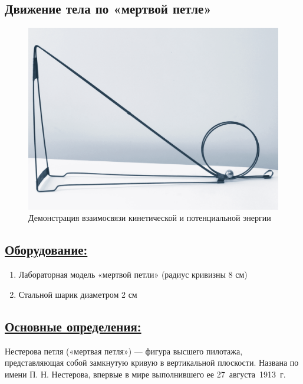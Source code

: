 \documentclass[14pt,a4paper,oneside]{extarticle}	%
\begin{document}

\begin{center}
	\subsection*{Движение тела по «мертвой петле»}
\end{center}

\begin{figure}[H] 
	\centering 		
	\includegraphics[width=0.75\linewidth]{loop-1.png}
	\caption{Демонстрация взаимосвязи кинетической и потенциальной энергии}
	\label{loop-1}
\end{figure}

\subsection*{\underline{Оборудование:}}

\begin{enumerate}
	\item Лабораторная модель «мертвой петли» (радиус кривизны 8 см)
	\item Стальной шарик диаметром 2 см
\end{enumerate}

\newpage
\subsection*{\underline{Основные определения:}}

Нестерова петля («мертвая петля») — фигура высшего пилотажа, 
представляющая собой замкнутую кривую в вертикальной плоскости. 
Названа по имени П. Н. Нестерова, впервые в мире выполнившего ее 27~августа~1913~г.
\end{document}
